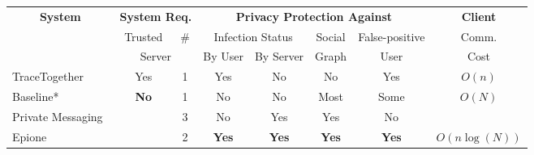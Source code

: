 \documentclass[11pt]{article} %
\newcommand{\dect}{\textsf{Epione}\xspace}
\begin{document}
\begin{table}[]
	\footnotesize
	\centering
	\begin{tabular}{|l||c|c|c|c|c|c|c|}
		\hline
		\multicolumn{1}{|c|}{\multirow{3}{*}{\textbf{System}}}                        & \multicolumn{2}{c|}{\textbf{System Req.}}                 & \multicolumn{4}{c|}{\textbf{Privacy Protection Against}}                      & \textbf{Client}             \\ 
		\multicolumn{1}{|c|}{}                                               & Trusted                      & \# & \multicolumn{2}{c|}{Infection Status} & Social & False-positive       & Comm.                \\ 
		\multicolumn{1}{|c|}{}                                      & \multicolumn{2}{c|}{Server}                                               & By User          & By Server  & Graph           & User          & Cost                   \\ \hline \hline
		TraceTogether~\cite{ttg}                                                        & Yes                          & 1                         & Yes              & No & No              & Yes                       & $O(n)$     \\ \cline{1-8}
		Baseline*                 & \multirow{3}{*}{\textbf{No}} & 1                         & No               & No     & Most          & Some                      & \multirow{2}{*}{$O(N)$} \\ \cline{1-1} \cline{3-7} 
		
		Private Messaging~\cite{cho2020contact} &                              & 3                         & No               & Yes   & Yes         & No                      &                    \\ \cline{1-1} \cline{3-7}\cline{8-8}
		
		\dect                                                 &                              & 2                      &   \textbf{Yes}    & \textbf{Yes} & \textbf{Yes}   & \textbf{Yes}   &  $O(n\log(N))$   \\ \hline
	\end{tabular}
	

\end{table}
\end{document}
